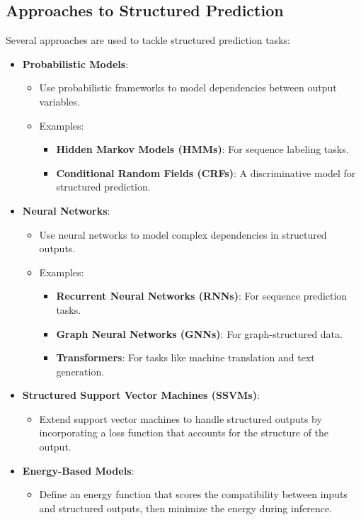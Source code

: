 \begin{notechapter}
\section{Approaches to Structured Prediction}
Several approaches are used to tackle structured prediction tasks:
\begin{itemize}
  \item \textbf{Probabilistic Models}:
    \begin{itemize}
      \item Use probabilistic frameworks to model dependencies between 
        output variables.
      \item Examples:
        \begin{itemize}
          \item \textbf{Hidden Markov Models (HMMs)}: For sequence 
            labeling tasks.
          \item \textbf{Conditional Random Fields (CRFs)}: A 
            discriminative model for structured prediction.
        \end{itemize}
    \end{itemize}
  \item \textbf{Neural Networks}:
    \begin{itemize}
      \item Use neural networks to model complex dependencies in 
        structured outputs.
      \item Examples:
        \begin{itemize}
          \item \textbf{Recurrent Neural Networks (RNNs)}: For sequence 
            prediction tasks.
          \item \textbf{Graph Neural Networks (GNNs)}: For 
            graph-structured data.
          \item \textbf{Transformers}: For tasks like machine 
            translation and text generation.
        \end{itemize}
    \end{itemize}
  \item \textbf{Structured Support Vector Machines (SSVMs)}:
    \begin{itemize}
      \item Extend support vector machines to handle structured outputs 
        by incorporating a loss function that accounts for the 
        structure of the output.
    \end{itemize}
  \item \textbf{Energy-Based Models}:
    \begin{itemize}
      \item Define an energy function that scores the compatibility 
        between inputs and structured outputs, then minimize the energy 
        during inference.
    \end{itemize}
\end{itemize}


\end{notechapter}
